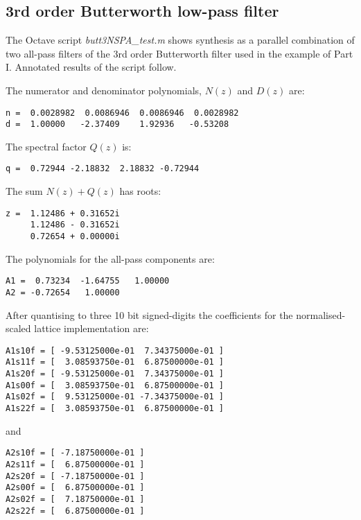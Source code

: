 \documentclass[a4paper,twoside,10pt,english]{report}
\begin{document}
\subsection{3rd order Butterworth low-pass filter}
The Octave script \emph{butt3NSPA\_test.m}
shows synthesis as a parallel combination of two all-pass filters
of the 3rd order Butterworth filter used in the example of Part I.
Annotated results of the script follow.

The numerator and denominator polynomials, $N\left(z\right)$ and
$D\left(z\right)$ are:
\begin{small}
\begin{verbatim}
n =  0.0028982  0.0086946  0.0086946  0.0028982
d =  1.00000   -2.37409    1.92936   -0.53208
\end{verbatim}
\end{small}
The spectral factor $Q\left(z\right)$ is:
\begin{small}
\begin{verbatim}
q =  0.72944 -2.18832  2.18832 -0.72944
\end{verbatim}
\end{small}
The sum $N\left(z\right)+Q\left(z\right)$ has roots:
\begin{small}
\begin{verbatim}
z =  1.12486 + 0.31652i  
     1.12486 - 0.31652i  
     0.72654 + 0.00000i
\end{verbatim}
\end{small}
The polynomials for the all-pass components are:
\begin{small}
\begin{verbatim}
A1 =  0.73234  -1.64755   1.00000
A2 = -0.72654   1.00000
\end{verbatim}
\end{small}
After quantising to three 10 bit signed-digits the coefficients for the 
normalised-scaled lattice implementation are:
\begin{small}
\begin{verbatim}
A1s10f = [ -9.53125000e-01  7.34375000e-01 ]
A1s11f = [  3.08593750e-01  6.87500000e-01 ]
A1s20f = [ -9.53125000e-01  7.34375000e-01 ]
A1s00f = [  3.08593750e-01  6.87500000e-01 ]
A1s02f = [  9.53125000e-01 -7.34375000e-01 ]
A1s22f = [  3.08593750e-01  6.87500000e-01 ]
\end{verbatim}
\end{small}
and
\begin{small}
\begin{verbatim}
A2s10f = [ -7.18750000e-01 ]
A2s11f = [  6.87500000e-01 ]
A2s20f = [ -7.18750000e-01 ]
A2s00f = [  6.87500000e-01 ]
A2s02f = [  7.18750000e-01 ]
A2s22f = [  6.87500000e-01 ]
\end{verbatim}
\end{small}
\end{document}
